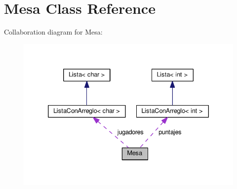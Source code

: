 \hypertarget{class_mesa}{}\section{Mesa Class Reference}
\label{class_mesa}


Collaboration diagram for Mesa\+:\nopagebreak
\begin{figure}[H]
\begin{center}
\leavevmode
\includegraphics[width=335pt]{class_mesa__coll__graph}
\end{center}
\end{figure}
